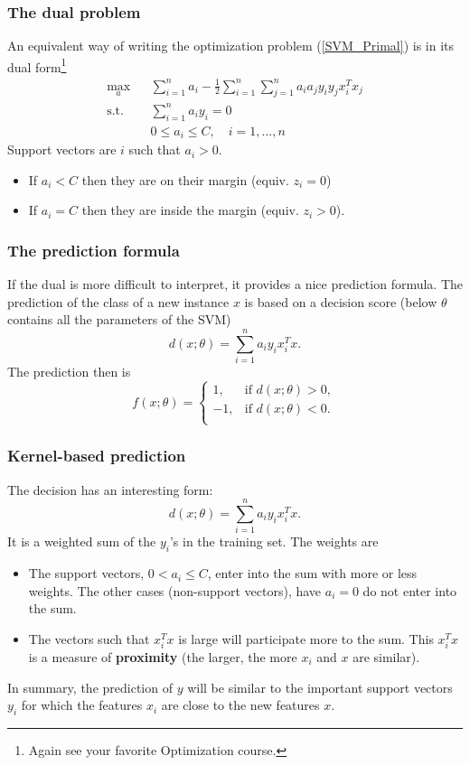 \begin{frame}
\frametitle{The dual problem}
An equivalent way of writing the optimization problem (\ref{SVM_Primal}) is in its dual form\footnote{Again see your favorite Optimization course.}
\begin{eqnarray}
\label{SVM_Dual}
\nonumber \max_{a} &&   \sum_{i=1}^n a_i - \frac{1}{2}\sum_{i=1}^n\sum_{j=1}^n a_i a_j y_iy_j x_i^Tx_j\\
\mbox{s.t. } && \sum_{i=1}^n a_i y_i = 0\\
\nonumber && 0 \leq a_i \leq C, \quad i=1,\ldots ,n
\end{eqnarray}
Support vectors are $i$ such that $a_i>0$. 
\begin{itemize}
\item If $a_i < C$ then they are on their margin (equiv. $z_i=0$)
\item If $a_i=C$ then they are inside the margin (equiv. $z_i>0$).
\end{itemize}
\end{frame}
\begin{frame}
\frametitle{The prediction formula}
If the dual is more difficult to interpret, it provides a nice prediction formula. The prediction of the class of a new instance $x$ is based on a decision score (below $\theta$ contains all the parameters of the SVM)
$$
d(x;\theta) = \sum_{i=1}^n a_i y_i x_i^Tx.
$$
The prediction then is  
$$
f(x;\theta) = \left\{
\begin{array}{ll}
1, & \mbox{if } d(x;\theta) > 0,\\
-1, & \mbox{if } d(x;\theta) < 0.\\
\end{array}
\right.
$$
\end{frame}
\begin{frame}
\frametitle{Kernel-based prediction}
The decision has an interesting form:
$$
d(x;\theta) = \sum_{i=1}^n a_i y_i x_i^Tx.
$$
It is a weighted sum of the $y_i$'s in the training set. The weights are
\begin{itemize}
\item The support vectors, $0 < a_i \leq C$, enter into the sum with more or less weights. The other cases (non-support vectors), have $a_i=0$ do not enter into the sum.
\item The vectors such that $x_i^Tx$ is large will participate more to the sum. This $x_i^Tx$ is a measure of {\bf proximity} (the larger, the more $x_i$ and $x$ are similar). 
\end{itemize}
In summary, the prediction of $y$ will be similar to the important support vectors $y_i$ for which the features $x_i$ are close to the new features $x$.
\end{frame}
